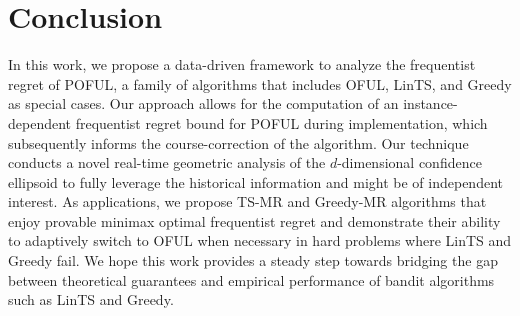 \section{Conclusion}

In this work, we propose a data-driven framework to analyze the frequentist regret of POFUL, a family of algorithms that includes OFUL, LinTS, and Greedy as special cases. Our approach allows for the computation of an instance-dependent frequentist regret bound for POFUL during implementation, which subsequently informs the course-correction of the algorithm. Our technique conducts a novel real-time geometric analysis of the $d$-dimensional confidence ellipsoid to fully leverage the historical information and might be of independent interest. As applications, we propose TS-MR and Greedy-MR algorithms that enjoy provable minimax optimal frequentist regret and demonstrate their ability to adaptively switch to OFUL when necessary in hard problems where LinTS and Greedy fail. We hope this work provides a steady step towards bridging the gap between theoretical guarantees and empirical performance of bandit algorithms such as LinTS and Greedy.